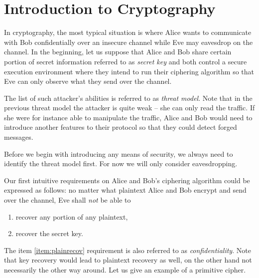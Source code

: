 \section{Introduction to Cryptography}
\label{sec:introcrypto}


In cryptography, the most typical situation is where Alice wants to communicate with Bob confidentially over an insecure channel while Eve may eavesdrop on the channel. In the beginning, let us suppose that Alice and Bob share certain portion of secret information referred to as {\em secret key} and both control a secure execution environment where they intend to run their ciphering algorithm so that Eve can only observe what they send over the channel.

\begin{note}
\label{note:threat}
	The list of such attacker's abilities is referred to as {\em threat model}. Note that in the previous threat model the attacker is quite weak -- she can only read the traffic. If she were for instance able to manipulate the traffic, Alice and Bob would need to introduce another features to their protocol so that they could detect forged messages.
	
	Before we begin with introducing any means of security, we always need to identify the threat model first. For now we will only consider eavesdropping.
\end{note}

Our first intuitive requirements on Alice and Bob's ciphering algorithm could be expressed as follows: no matter what plaintext Alice and Bob encrypt and send over the channel, Eve shall {\em not} be able to
\begin{enumerate}
	\item recover any portion of any plaintext, \label{item:plainrecov}
	\item recover the secret key. \label{item:keyrecov}
\end{enumerate}
The item \ref{item:plainrecov} requirement is also referred to as {\em confidentiality}. Note that key recovery would lead to plaintext recovery as well, on the other hand not necessarily the other way around. Let us give an example of a primitive cipher.

